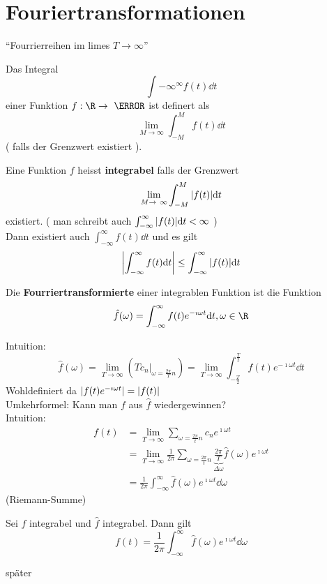 \chapter{Fouriertransformationen}
\enquote{Fourrierreihen im limes $T \rightarrow \infty$}

\begin{def*}[note = Integral , index = Integral]
	Das Integral
	\[ \int{-\infty}^{\infty} f(t) \dd t \]
	einer Funktion $f: \R \rightarrow \C$ ist definert als
	\[ \lim_{M \rightarrow \infty} \int_{-M}^M f(t) \dd t \]
	( falls der Grenzwert existiert ).
\end{def*}
\begin{def*}[note = integrabel , index = integrabel]
	Eine Funktion $f$ heisst \textbf{integrabel} falls der Grenzwert
	\[ \lim_{M \rightarrow \infty} \int_{-M}^M \abs{f(t)} \dd t \]
	existiert. ( man schreibt auch $\int_{-\infty}^\infty \abs{f(t)} \dd t < \infty$ ) \\
	Dann existiert auch $\int_{-\infty}^\infty f(t) \dd t$ und es gilt
	\[ \abs{\int_{-\infty}^\infty f(t) \dd t} \leq \int_{-\infty}^\infty \abs{f(t)} \dd t \]
\end{def*}
\begin{def*}[note = Fourriertransformierte , index = Fourrier transformierte , indexformat = {1!~.2 2!1.~}]
	Die \textbf{Fourriertransformierte} einer integrablen Funktion ist die Funktion
	\[ \hat{f}(\omega) = \int_{-\infty}^\infty f(t) e^{-\imath\omega t} \dd t , \omega \in \R \]
\end{def*}
Intuition:
\[ \hat{f}(\omega) = \lim_{T \rightarrow \infty} ( T c_n |_{\omega = \frac{2\pi}{T} n} ) = \lim_{T \rightarrow \infty} \int_{-\frac{T}{2}}^{\frac{T}{2}} f(t) e^{-\imath\omega t} \dd t \]
Wohldefiniert da $\abs{f(t) e^{-\imath\omega t}} = \abs{f(t)}$ \\
Umkehrformel: Kann man $f$ aus $\hat{f}$ wiedergewinnen? \\
Intuition:
\[ \begin{split}
	f(t)	&= \lim_{T \rightarrow \infty} \sum_{\omega = \frac{2\pi}{t} n} c_n e^{\imath \omega t} \\
		&= \lim_{T \rightarrow \infty} \frac{1}{2\pi} \sum_{\omega = \frac{2\pi}{t} n} \underbrace{\frac{2\pi}{T}}_{\Delta \omega} \hat{f}(\omega) e^{\imath\omega t} \\
		&= \frac{1}{2\pi} \int_{-\infty}^\infty \hat{f}(\omega) e^{\imath\omega t} \dd \omega
\end{split} \]
(Riemann-Summe) \\
\begin{satz*}[note = Umkehrsatz von Fourier]
	Sei $f$ integrabel und $\hat{f}$ integrabel. Dann gilt
	\[ f(t) = \frac{1}{2\pi} \int_{-\infty}^\infty \hat{f}(\omega) e^{\imath\omega t} \dd \omega \]
	\begin{bew}
		später
	\end{bew}
\end{satz*}
